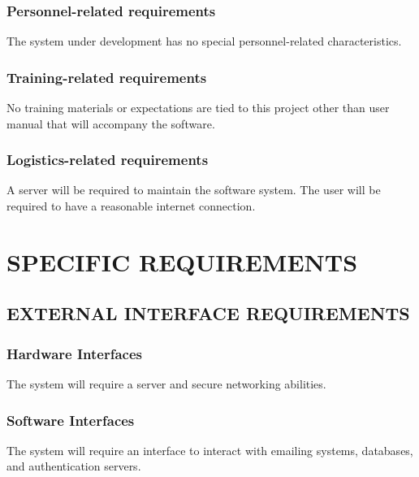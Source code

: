 \documentclass[letterpaper]{article}
\begin{document}
\subsubsection[Personnel{}-related requirements]{\rmfamily
Personnel-related requirements}
{\color{black}
The system under development has no special personnel-related
characteristics. }

\subsubsection[Training{}-related requirements]{\rmfamily
Training-related requirements}
{\color{black}
No training materials or expectations are tied to this project other
than user manual that will accompany the software.}

\subsubsection[Logistics{}-related requirements]{\rmfamily
Logistics-related requirements}
{\color{black}
A server will be required to maintain the software system. The user will
be required to have a reasonable internet connection.}

\subsubsection[]{\rmfamily }
\section[SPECIFIC REQUIREMENTS]{\rmfamily SPECIFIC REQUIREMENTS}
\subsection[EXTERNAL INTERFACE REQUIREMENTS]{\rmfamily EXTERNAL
INTERFACE REQUIREMENTS}
\subsubsection[Hardware Interfaces]{\rmfamily Hardware Interfaces}
{\color{black}
The system will require a server and secure networking abilities.}

\subsubsection[Software Interfaces]{\rmfamily Software Interfaces}
{\color{black}
The system will require an interface to interact with emailing systems,
databases, and authentication servers.}
\end{document}
